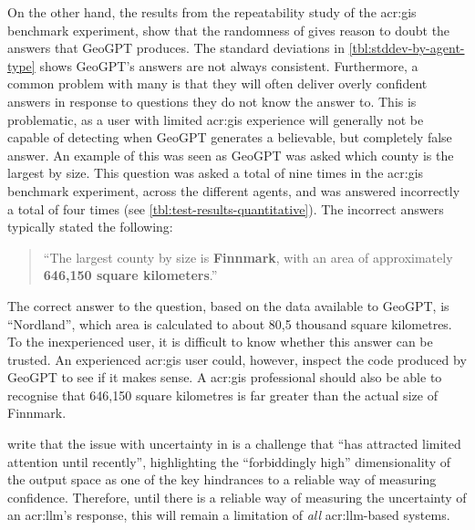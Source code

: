 On the other hand, the results from the repeatability study of the \acrshort{acr:gis} benchmark experiment, show that the randomness of  gives reason to doubt the answers that GeoGPT produces. The standard deviations in \autoref{tbl:stddev-by-agent-type} shows GeoGPT's answers are not always consistent. Furthermore, a common problem with many  is that they will often deliver overly confident answers in response to questions they do not know the answer to. This is problematic, as a user with limited \acrshort{acr:gis} experience will generally not be capable of detecting when GeoGPT generates a believable, but completely false answer. An example of this was seen as GeoGPT was asked which county is the largest by size. This question was asked a total of nine times in the \acrshort{acr:gis} benchmark experiment, across the different agents, and was answered incorrectly a total of four times (see \autoref{tbl:test-results-quantitative}). The incorrect answers typically stated the following:

\begin{quote}
    \enquote{The largest county by size is \textbf{Finnmark}, with an area of approximately \textbf{646,150 square kilometers}.}
\end{quote}

The correct answer to the question, based on the data available to GeoGPT, is \enquote{Nordland}, which area is calculated to about 80,5 thousand square kilometres. To the inexperienced user, it is difficult to know whether this answer can be trusted. An experienced \acrshort{acr:gis} user could, however, inspect the code produced by GeoGPT to see if it makes sense. A \acrshort{acr:gis} professional should also be able to recognise that 646,150 square kilometres is far greater than the actual size of Finnmark.

\cite[1-2]{linGeneratingConfidenceUncertainty2023} write that the issue with uncertainty in  is a challenge that \enquote{has attracted limited attention until recently}, highlighting the \enquote{forbiddingly high} dimensionality of the output space as one of the key hindrances to a reliable way of measuring confidence. Therefore, until there is a reliable way of measuring the uncertainty of an \acrshort{acr:llm}'s response, this will remain a limitation of \textit{all} \acrshort{acr:llm}-based systems.




